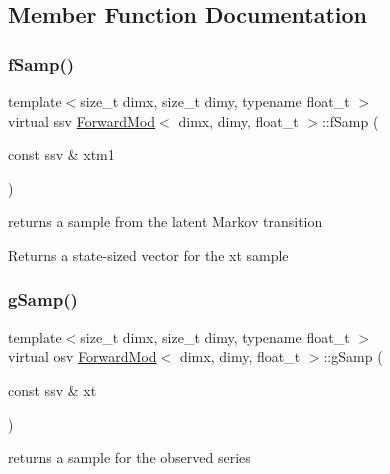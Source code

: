 \subsection{Member Function Documentation}
\mbox{\label{classForwardMod_aa46752032b11a6ac76cd01e13780a932}} 
\subsubsection{\texorpdfstring{f\+Samp()}{fSamp()}}
{\footnotesize\ttfamily template$<$size\+\_\+t dimx, size\+\_\+t dimy, typename float\+\_\+t $>$ \\
virtual ssv \hyperlink{classForwardMod}{Forward\+Mod}$<$ dimx, dimy, float\+\_\+t $>$\+::f\+Samp (\begin{DoxyParamCaption}\item[{const ssv \&}]{xtm1 }\end{DoxyParamCaption})\hspace{0.3cm}{\ttfamily [pure virtual]}}



returns a sample from the latent Markov transition 

\begin{DoxyReturn}{Returns}
a state-\/sized vector for the xt sample 
\end{DoxyReturn}
\mbox{\label{classForwardMod_a3264f80eae33f89a504cdb25634cadda}} 
\subsubsection{\texorpdfstring{g\+Samp()}{gSamp()}}
{\footnotesize\ttfamily template$<$size\+\_\+t dimx, size\+\_\+t dimy, typename float\+\_\+t $>$ \\
virtual osv \hyperlink{classForwardMod}{Forward\+Mod}$<$ dimx, dimy, float\+\_\+t $>$\+::g\+Samp (\begin{DoxyParamCaption}\item[{const ssv \&}]{xt }\end{DoxyParamCaption})\hspace{0.3cm}{\ttfamily [pure virtual]}}



returns a sample for the observed series 

